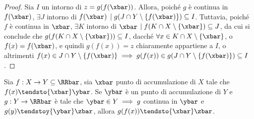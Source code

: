 \documentclass[11pt]{article}
\begin{document}
	\begin{proof}
		Sia $I$ un intorno di $z = g(f(\xbar))$. Allora, poiché $g$ è continua
		in $f(\xbar)$, $\exists J$ intorno di $f(\xbar)$ $\mid g(J \cap Y \setminus \{f(\xbar)\}) \subseteq
		I$. Tuttavia, poiché $f$ è continua in $\xbar$, $\exists K$ intorno
		di $\xbar$ $\mid f(K \cap X \setminus \{\xbar\}) \subseteq J$, da cui si conclude che
		$g(f(K \cap X \setminus \{\xbar\})) \subseteq I$, dacché $\forall x \in K \cap X \setminus \{\xbar\}$,
		o $f(x) = f(\xbar)$, e quindi $g(f(x)) = z$ chiaramente appartiene a $I$, o altrimenti
		$f(x) \in J \cap Y \setminus \{f(\xbar)\} \implies g(f(x)) \in g(J \cap Y \setminus \{f(\xbar)\}) \subseteq I$.
	\end{proof}

	\begin{theorem}
		Sia $f : X \to Y \subseteq \RRbar$, sia $\xbar$ punto di
		accumulazione di $X$ tale che $f(x) \tendsto{\xbar} \ybar$.
		Se $\ybar$ è un punto di accumulazione di $Y$ e $g : Y \to \RRbar$
		è tale che $\ybar \in Y \implies
		g$ continua in $\ybar$ e $g(y) \tendstoy{\ybar} \zbar$, allora
		$g(f(x)) \tendsto{\xbar} \zbar$.
	\end{theorem}
\end{document}
